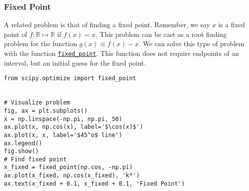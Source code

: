 \documentclass[12pt, a4paper]{article}
\begin{document}
\subsubsection{Fixed Point}
\label{sec:org17ade52}
A related problem is that of finding a fixed point.
Remember, we say \(x\) is a fixed point of \(f:\mathbb{R}\mapsto\mathbb{R}\) if \(f(x)=x\).
This problem can be cast as a root finding problem for the function \(g(x)\equiv f(x) - x\).
We can solve this type of problem with the function \href{https://docs.scipy.org/doc/scipy-1.3.0/reference/generated/scipy.optimize.fixed\_point.html\#scipy-optimize-fixed-point}{\texttt{fixed\_point}}.
This function does not require endpoints of an interval, but an initial guess for the fixed point.
\lstset{language=jupyter-python,label= ,caption= ,captionpos=b,numbers=none}
\begin{lstlisting}
from scipy.optimize import fixed_point


# Visualize problem
fig, ax = plt.subplots()
x = np.linspace(-np.pi, np.pi, 50)
ax.plot(x, np.cos(x), label='$\cos(x)$')
ax.plot(x, x, label='$45^o$ line')
ax.legend()
fig.show()
# Find fixed point
x_fixed = fixed_point(np.cos, -np.pi)
ax.plot(x_fixed, np.cos(x_fixed), 'k*')
ax.text(x_fixed + 0.1, x_fixed + 0.1, 'Fixed Point')
\end{lstlisting}
\end{document}
